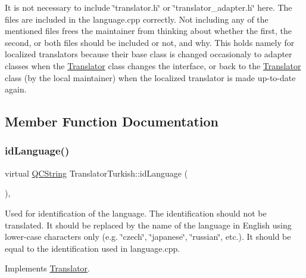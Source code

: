 It is not necessary to include \char`\"{}translator.\+h\char`\"{} or \char`\"{}translator\+\_\+adapter.\+h\char`\"{} here. The files are included in the language.\+cpp correctly. Not including any of the mentioned files frees the maintainer from thinking about whether the first, the second, or both files should be included or not, and why. This holds namely for localized translators because their base class is changed occasionaly to adapter classes when the \mbox{\hyperlink{class_translator}{Translator}} class changes the interface, or back to the \mbox{\hyperlink{class_translator}{Translator}} class (by the local maintainer) when the localized translator is made up-\/to-\/date again. 

\subsection{Member Function Documentation}
\mbox{\label{class_translator_turkish_aa39480bab6e67daffa6917d13dd27a36}} 
\subsubsection{\texorpdfstring{idLanguage()}{idLanguage()}}
{\footnotesize\ttfamily virtual \mbox{\hyperlink{class_q_c_string}{Q\+C\+String}} Translator\+Turkish\+::id\+Language (\begin{DoxyParamCaption}{ }\end{DoxyParamCaption})\hspace{0.3cm}{\ttfamily [inline]}, {\ttfamily [virtual]}}

Used for identification of the language. The identification should not be translated. It should be replaced by the name of the language in English using lower-\/case characters only (e.\+g. \char`\"{}czech\char`\"{}, \char`\"{}japanese\char`\"{}, \char`\"{}russian\char`\"{}, etc.). It should be equal to the identification used in language.\+cpp. 

Implements \mbox{\hyperlink{class_translator}{Translator}}.

\mbox{\label{class_translator_turkish_ae8a1038a0739c663e688288778e083c8}} 
